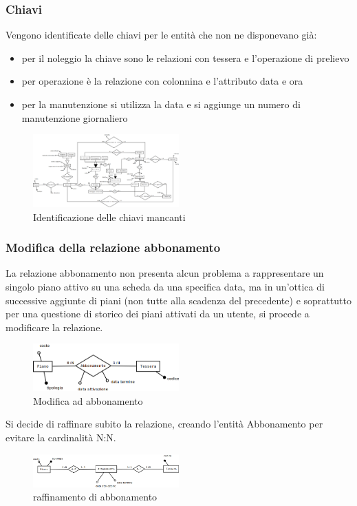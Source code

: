 \documentclass[a4paper,twoside]{article}
\begin{document}
\subsubsection{Chiavi}
Vengono identificate delle chiavi per le entità che non ne disponevano già:
\begin{itemize}
 \item per il noleggio la chiave sono le relazioni con tessera e l'operazione di prelievo
 \item per operazione è la relazione con colonnina e l'attributo data e ora
 \item per la manutenzione si utilizza la data e si aggiunge un numero di manutenzione giornaliero
\end{itemize}
\begin{figure}[H]
 \centering
  \includegraphics[width=0.5\textwidth]{Immagini-Grafici/Concettuale15.png}
\caption{Identificazione delle chiavi mancanti}
\end{figure}

\subsubsection{Modifica della relazione abbonamento}
La relazione abbonamento non presenta alcun problema a rappresentare un singolo piano attivo su una scheda da una specifica data, ma in un'ottica di successive aggiunte di piani (non tutte alla scadenza del precedente) e soprattutto per una questione di storico dei piani attivati da un utente, si procede a modificare la relazione.
\begin{figure}[H]
 \centering
  \includegraphics[width=0.5\textwidth]{Immagini-Grafici/Concettuale16.png}
\caption{Modifica ad abbonamento}
\end{figure}
Si decide di raffinare subito la relazione, creando l'entità Abbonamento per evitare la cardinalità N:N.
\begin{figure}[H]
 \centering
  \includegraphics[width=0.5\textwidth]{Immagini-Grafici/Concettuale17.png}
\caption{raffinamento di abbonamento}
\end{figure}
\end{document}

